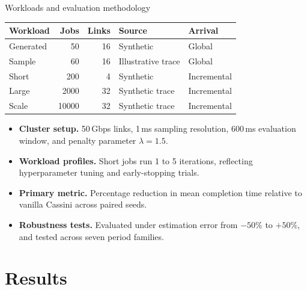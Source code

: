 \documentclass[aspectratio=169,11pt,c]{beamer}
\begin{document}
\begin{frame}{Workloads and evaluation methodology}
  \centering\footnotesize
  \begin{tabular}{lrrll}
    \toprule
    Workload & Jobs & Links & Source & Arrival \\
    \midrule
    Generated & 50 & 16 & Synthetic & Global \\
    Sample & 60 & 16 & Illustrative trace & Global \\
    Short & 200 & 4 & Synthetic & Incremental \\
    Large & 2000 & 32 & Synthetic trace & Incremental \\
    Scale & 10000 & 32 & Synthetic trace & Incremental \\
    \bottomrule
  \end{tabular}
  \vspace{0.4em}
  \begin{itemize}[<+->]\scriptsize
    \item \textbf{Cluster setup.} 50\,Gbps links, 1\,ms sampling resolution, 600\,ms evaluation window, and penalty parameter $\lambda = 1.5$.
    \item \textbf{Workload profiles.} Short jobs run 1 to 5 iterations, reflecting hyperparameter tuning and early-stopping trials.
    \item \textbf{Primary metric.} Percentage reduction in mean completion time relative to vanilla Cassini across paired seeds.
    \item \textbf{Robustness tests.} Evaluated under estimation error from $-50\%$ to $+50\%$, and tested across seven period families.
  \end{itemize}
\end{frame}

\section{Results}
\end{document}
